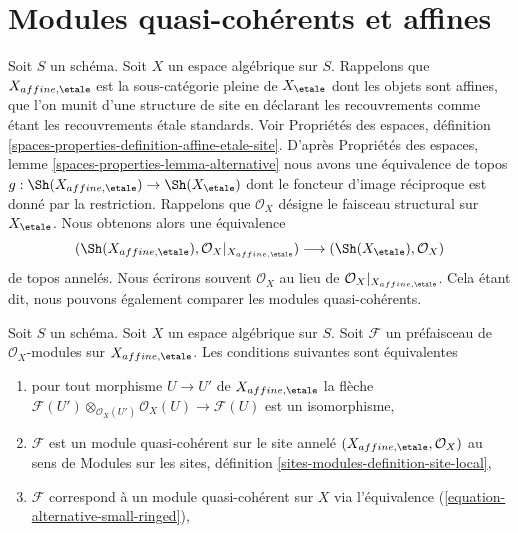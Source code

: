 \section{Modules quasi-cohérents et affines}
\label{section-alternative-quasi-coherent}

\noindent
Soit $S$ un schéma. Soit $X$ un espace algébrique sur $S$.
Rappelons que $X_{affine, \etale}$ est la sous-catégorie pleine de $X_\etale$
dont les objets sont affines, que l'on munit d'une structure de site en déclarant les recouvrements
comme étant les recouvrements \'etale standards. Voir Propriétés des espaces, définition
\ref{spaces-properties-definition-affine-etale-site}.
D'après Propriétés des espaces, lemme \ref{spaces-properties-lemma-alternative}
nous avons une équivalence de topos
$g : \Sh(X_{affine, \etale}) \to \Sh(X_\etale)$
dont le foncteur d'image réciproque est donné par la restriction.
Rappelons que $\mathcal{O}_X$ désigne le faisceau structural sur
$X_\etale$. Nous obtenons alors une équivalence
\begin{equation}
\label{equation-alternative-small-ringed}
(\Sh(X_{affine, \etale}), \mathcal{O}_X|_{X_{affine, \etale}})
\longrightarrow
(\Sh(X_\etale), \mathcal{O}_X)
\end{equation}
de topos annelés. Nous écrirons souvent $\mathcal{O}_X$
au lieu de $\mathcal{O}_X|_{X_{affine, \etale}}$.
Cela étant dit, nous pouvons également comparer les modules quasi-cohérents.

\begin{lemma}
\label{lemma-quasi-coherent-alternative-small}
Soit $S$ un schéma. Soit $X$ un espace algébrique sur $S$.
Soit $\mathcal{F}$ un préfaisceau de $\mathcal{O}_X$-modules
sur $X_{affine, \etale}$. Les conditions suivantes sont équivalentes
\begin{enumerate}
\item pour tout morphisme $U \to U'$ de $X_{affine, \etale}$ la flèche
$\mathcal{F}(U') \otimes_{\mathcal{O}_X(U')} \mathcal{O}_X(U)
\to \mathcal{F}(U)$ est un isomorphisme,
\item $\mathcal{F}$ est un module quasi-cohérent sur le site annelé
$(X_{affine, \etale}, \mathcal{O}_X)$ au sens de
Modules sur les sites, définition \ref{sites-modules-definition-site-local},
\item $\mathcal{F}$ correspond à un module quasi-cohérent sur $X$
via l'équivalence (\ref{equation-alternative-small-ringed}),
\end{enumerate}
\end{lemma}

